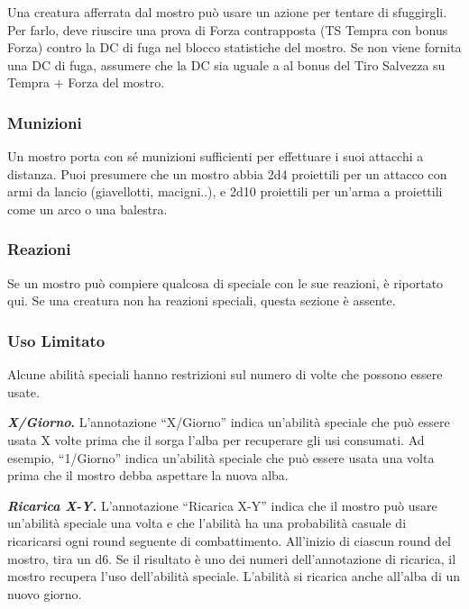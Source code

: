 \begin{multicols}{2}
Una creatura afferrata dal mostro può usare un azione per tentare di sfuggirgli. Per farlo, deve riuscire una prova di Forza contrapposta (TS Tempra con bonus Forza) contro la DC di fuga nel blocco statistiche del mostro. Se non viene fornita una DC di fuga, assumere che la DC sia uguale a al bonus del Tiro Salvezza su Tempra + Forza del mostro.

\subsubsection{Munizioni}

Un mostro porta con sé munizioni sufficienti per effettuare i suoi attacchi a distanza. Puoi presumere che un mostro abbia 2d4 proiettili per un attacco con armi da lancio (giavellotti, macigni..), e 2d10 proiettili per un'arma a proiettili come un arco o una balestra.

\subsubsection{Reazioni}

Se un mostro può compiere qualcosa di speciale con le sue reazioni, è riportato qui. Se una creatura non ha reazioni speciali, questa sezione è assente.


\subsubsection{Uso Limitato}

Alcune abilità speciali hanno restrizioni sul numero di volte che possono essere usate.

\textbf{\textit{X/Giorno}.} L'annotazione ``X/Giorno'' indica un'abilità speciale che può essere usata X volte prima che il sorga l'alba per recuperare gli usi consumati. Ad esempio, ``1/Giorno'' indica un'abilità speciale che può essere usata una volta prima che il mostro debba aspettare la nuova alba.

\textit{\textbf{Ricarica X-Y.}} L'annotazione ``Ricarica X-Y'' indica che il mostro può usare un'abilità speciale una volta e che l'abilità ha una probabilità casuale di ricaricarsi ogni round seguente di combattimento. All'inizio di ciascun round del mostro, tira un d6. Se il risultato è uno dei numeri dell'annotazione di ricarica, il mostro recupera l'uso dell'abilità speciale. L'abilità si ricarica anche all'alba di un nuovo giorno.

%


\end{multicols}
